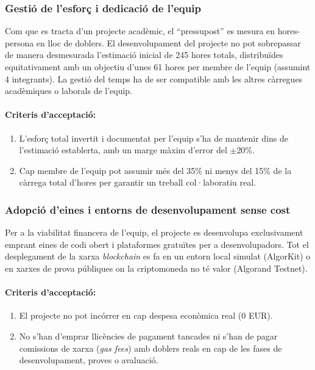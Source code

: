 \subsubsection{Gestió de l'esforç i dedicació de l'equip}

Com que es tracta d'un projecte acadèmic, el ``pressupost'' es mesura en hores-persona en lloc de doblers. 
El desenvolupament del projecte no pot sobrepassar de manera desmesurada l'estimació inicial de 245 hores totals, distribuïdes equitativament amb un objectiu d'unes 61 hores per membre de l'equip (assumint 4 integrants). 
La gestió del temps ha de ser compatible amb les altres càrregues acadèmiques o laborals de l'equip.

\paragraph{Criteris d'acceptació:}
\begin{enumerate}[label=\roman*.]
    \item L'esforç total invertit i documentat per l'equip s'ha de mantenir dins de l'estimació establerta, amb un marge màxim d'error del $\pm$20\%.
    \item Cap membre de l'equip pot assumir més del 35\% ni menys del 15\% de la càrrega total d'hores per garantir un treball col·laboratiu real.
\end{enumerate}

\subsubsection{Adopció d'eines i entorns de desenvolupament sense cost}

Per a la viabilitat financera de l'equip, el projecte es desenvolupa exclusivament emprant eines de codi obert i plataformes gratuïtes per a desenvolupadors. 
Tot el desplegament de la xarxa \textit{blockchain} es fa en un entorn local simulat (AlgorKit) o en xarxes de prova públiques on la criptomoneda no té valor (Algorand Testnet).

\paragraph{Criteris d'acceptació:}
\begin{enumerate}[label=\roman*.]
    \item El projecte no pot incórrer en cap despesa econòmica real (0 EUR).
    \item No s'han d'emprar llicències de pagament tancades ni s'han de pagar comissions de xarxa (\textit{gas fees}) amb doblers reals en cap de les fases de desenvolupament, proves o avaluació.
\end{enumerate}

